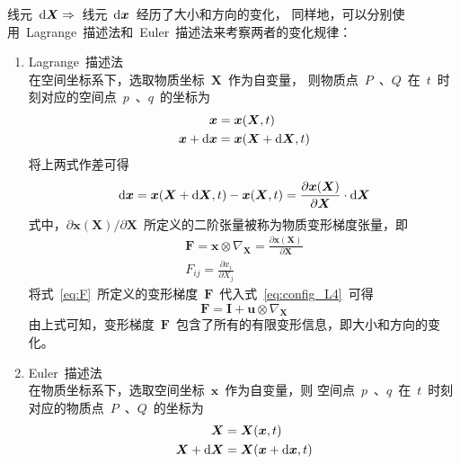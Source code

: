 线元~$\mathop{}\!\mathrm{d} \bm{X} \Rightarrow$~线元~$\mathop{}\!\mathrm{d} \bm{x}$~经历了大小和方向的变化，
同样地，可以分别使用~Lagrange~描述法和~Euler~描述法来考察两者的变化规律：
\begin{enumerate}
\item Lagrange~描述法\\
在空间坐标系下，选取物质坐标~$\bm{X}$~作为自变量，
则物质点~$P$~、$Q$~在~$t$~时刻对应的空间点~$p$~、$q$~的坐标为
\begin{subequations}
	\begin{align}
	\bm{x} &=\bm{x} (\bm{X},t)  \\
	\bm{x}+\mathop{}\!\mathrm{d} \bm{x}&=\bm{x} (\bm{X}+\mathop{}\!\mathrm{d} \bm{X},t)
	\end{align}
\end{subequations}
将上两式作差可得
\begin{equation}\label{eq:trans_F}
	\mathop{}\!\mathrm{d} \bm{x}=\bm{x} (\bm{X}+\mathop{}\!\mathrm{d} \bm{X},t)-\bm{x} (\bm{X},t)=
	\frac{\partial \bm{x} (\bm{X})}{\partial \bm{X}} \cdot \mathop{}\!\mathrm{d} \bm{X}
\end{equation}
式中，${\partial \bm{x} (\bm{X})}/{\partial \bm{X}}$~所定义的二阶张量被称为物质变形梯度张量，即
\begin{subequations}\label{eq:F}
	\begin{gather}
	\bm{F} = \bm{x} \otimes \nabla_{\bm{X}} = \frac{\partial \bm{x} (\bm{X})}{\partial \bm{X}} \\
	F_{ij} = \frac{\partial x_i}{\partial X_j}
	\end{gather}
\end{subequations}
将式~\eqref{eq:F}~所定义的变形梯度~$\bm{F}$~代入式~\eqref{eq:config_L4}~可得
\begin{equation}\label{eq:trans_u}
	\bm{F}=\bm{I}+\bm{u} \otimes \nabla_{\bm{X}}
\end{equation}
由上式可知，变形梯度~$\bm{F}$~包含了所有的有限变形信息，即大小和方向的变化。
\item Euler~描述法\\
在物质坐标系下，选取空间坐标~$\bm{x}$~作为自变量，则
空间点~$p$~、$q$~在~$t$~时刻对应的物质点~$P$~、$Q$~的坐标为
\begin{subequations}
	\begin{align}
	\bm{X} &=\bm{X} (\bm{x},t)  \\
	\bm{X}+\mathop{}\!\mathrm{d} \bm{X}&=\bm{X} (\bm{x}+\mathop{}\!\mathrm{d} \bm{x},t)
	\end{align}
\end{subequations}

\end{enumerate}
